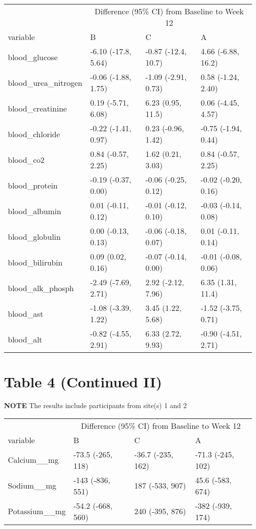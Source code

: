 \documentclass[]{article}
\begin{document}
\begin{table}[H]
\centering
\begin{tabular}{l|l|l|l}
\hline
\multicolumn{1}{c|}{ } & \multicolumn{3}{c}{Difference (95\% CI) from Baseline to Week 12} \\
\cline{2-4}
variable & B & C & A\\
\hline
blood\_glucose & -6.10 (-17.8, 5.64) & -0.87 (-12.4, 10.7) & 4.66 (-6.88, 16.2)\\
\hline
blood\_urea\_nitrogen & -0.06 (-1.88, 1.75) & -1.09 (-2.91, 0.73) & 0.58 (-1.24, 2.40)\\
\hline
blood\_creatinine & 0.19 (-5.71, 6.08) & 6.23 (0.95, 11.5) & 0.06 (-4.45, 4.57)\\
\hline
blood\_chloride & -0.22 (-1.41, 0.97) & 0.23 (-0.96, 1.42) & -0.75 (-1.94, 0.44)\\
\hline
blood\_co2 & 0.84 (-0.57, 2.25) & 1.62 (0.21, 3.03) & 0.84 (-0.57, 2.25)\\
\hline
blood\_protein & -0.19 (-0.37, 0.00) & -0.06 (-0.25, 0.12) & -0.02 (-0.20, 0.16)\\
\hline
blood\_albumin & 0.01 (-0.11, 0.12) & -0.01 (-0.12, 0.10) & -0.03 (-0.14, 0.08)\\
\hline
blood\_globulin & 0.00 (-0.13, 0.13) & -0.06 (-0.18, 0.07) & 0.01 (-0.11, 0.14)\\
\hline
blood\_bilirubin & 0.09 (0.02, 0.16) & -0.07 (-0.14, 0.00) & -0.01 (-0.08, 0.06)\\
\hline
blood\_alk\_phosph & -2.49 (-7.69, 2.71) & 2.92 (-2.12, 7.96) & 6.35 (1.31, 11.4)\\
\hline
blood\_ast & -1.08 (-3.39, 1.22) & 3.45 (1.22, 5.68) & -1.52 (-3.75, 0.71)\\
\hline
blood\_alt & -0.82 (-4.55, 2.91) & 6.33 (2.72, 9.93) & -0.90 (-4.51, 2.71)\\
\hline
\end{tabular}
\end{table}

\hypertarget{table-4-continued-ii}{%
\section{Table 4 (Continued II)}\label{table-4-continued-ii}}

\textbf{NOTE} The results include participants from site(s) 1 and 2

\begin{table}[H]
\centering
\begin{tabular}{l|l|l|l}
\hline
\multicolumn{1}{c|}{ } & \multicolumn{3}{c}{Difference (95\% CI) from Baseline to Week 12} \\
\cline{2-4}
variable & B & C & A\\
\hline
Calcium\_\_mg & -73.5 (-265, 118) & -36.7 (-235, 162) & -71.3 (-245, 102)\\
\hline
Sodium\_\_mg & -143 (-836, 551) & 187 (-533, 907) & 45.6 (-583, 674)\\
\hline
Potassium\_\_mg & -54.2 (-668, 560) & 240 (-395, 876) & -382 (-939, 174)\\
\hline
\end{tabular}
\end{table}
\end{document}
